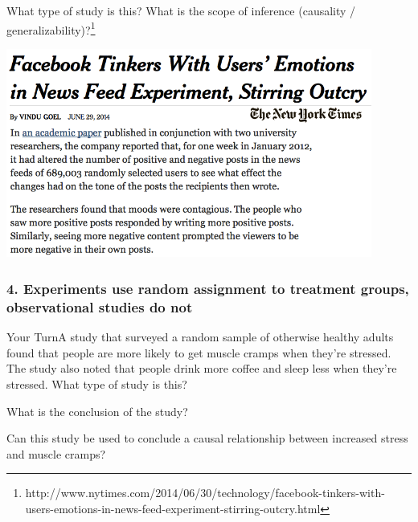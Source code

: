 \documentclass[11pt]{beamer}
\begin{document}

\begin{frame}

\begin{exampleblock}{}
What type of study is this? What is the scope of inference (causality / generalizability)?\footnote{http://www.nytimes.com/2014/06/30/technology/facebook-tinkers-with-users-emotions-in-news-feed-experiment-stirring-outcry.html}
\end{exampleblock}
\begin{center}
\includegraphics[width=0.9\textwidth]{figures/facebook_study}
\end{center}

\end{frame}


\begin{frame}
\frametitle{4. Experiments use random assignment to treatment groups, observational studies do not}

{\small
\begin{exampleblock}{Your Turn}A study that surveyed a random sample of otherwise healthy adults found that people are more likely to get muscle cramps when they're stressed. The study also noted that people drink more coffee and sleep less when they're stressed. What type of study is this?
\end{exampleblock}

\textit{}

\begin{exampleblock}{What is the conclusion of the study?}\end{exampleblock}

\textit{}

\begin{exampleblock}{Can this study be used to conclude a causal relationship between increased stress and muscle cramps?}\end{exampleblock}

\textit{}
}

\end{frame}
\end{document}

